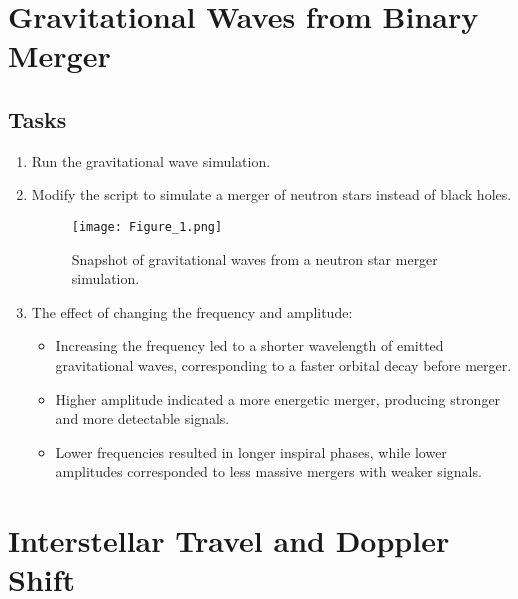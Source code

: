 \documentclass {article}
\begin{document}
\section{Gravitational Waves from Binary Merger}


\subsection{Tasks}
\begin{enumerate}
      \item Run the gravitational wave simulation.
    \item Modify the script to simulate a merger of neutron stars instead of black holes.
\begin{figure}[H]
    \centering
    \texttt{[image: Figure\_1.png]}  %
    \caption{Snapshot of gravitational waves from a neutron star merger simulation.}
    \label{fig:Figure_1}
\end{figure}

\item The effect of changing the frequency and amplitude:
    \begin{itemize}
        \item Increasing the frequency led to a shorter wavelength of emitted gravitational waves, corresponding to a faster orbital decay before merger.
        \item Higher amplitude indicated a more energetic merger, producing stronger and more detectable signals.
        \item Lower frequencies resulted in longer inspiral phases, while lower amplitudes corresponded to less massive mergers with weaker signals.
    \end{itemize}


\end{enumerate}

\section{Interstellar Travel and Doppler Shift}
\end{document}

